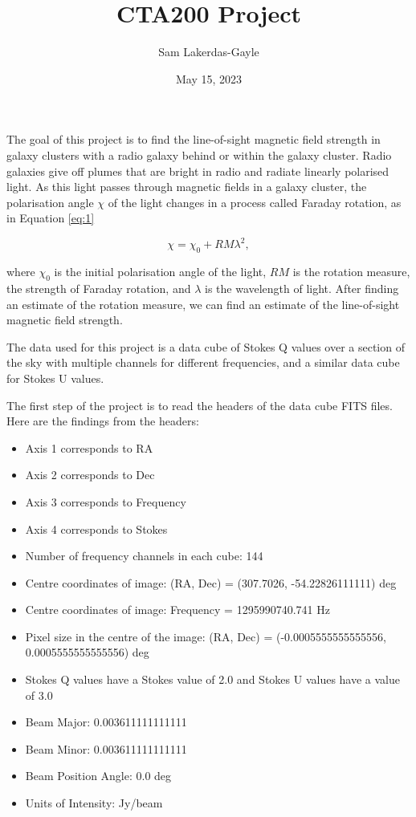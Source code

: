 \documentclass{article}
\title{CTA200 Project}
\author{Sam Lakerdas-Gayle}
\date{May 15, 2023}
\begin{document}
\maketitle

\newcommand{\pd}[2][]{\frac{\partial#1}{\partial#2}}

The goal of this project is to find the line-of-sight magnetic field strength in galaxy clusters with a radio galaxy behind or within the galaxy cluster. Radio galaxies give off plumes that are bright in radio and radiate linearly polarised light. As this light passes through magnetic fields in a galaxy cluster, the polarisation angle $\chi$ of the light changes in a process called Faraday rotation, as in Equation \ref{eq:1}

\begin{equation} \label{eq:1}
    \chi=\chi_0+RM\lambda^2,
\end{equation}

where $\chi_0$ is the initial polarisation angle of the light, $RM$ is the rotation measure, the strength of Faraday rotation, and $\lambda$ is the wavelength of light. After finding an estimate of the rotation measure, we can find an estimate of the line-of-sight magnetic field strength.

\vspace{0.3 cm}

The data used for this project is a data cube of Stokes Q values over a section of the sky with multiple channels for different frequencies, and a similar data cube for Stokes U values.

\vspace{0.3 cm}

The first step of the project is to read the headers of the data cube FITS files. Here are the findings from the headers:

\begin{itemize}
    \item Axis 1 corresponds to RA
    \item Axis 2 corresponds to Dec
    \item Axis 3 corresponds to Frequency
    \item Axis 4 corresponds to Stokes
    \item Number of frequency channels in each cube: 144
    \item Centre coordinates of image: (RA, Dec) = (307.7026, -54.22826111111) deg
    \item Centre coordinates of image: Frequency = 1295990740.741 Hz
    \item Pixel size in the centre of the image: (RA, Dec) = (-0.0005555555555556, 0.0005555555555556) deg
    \item Stokes Q values have a Stokes value of 2.0 and Stokes U values have a value of 3.0
    \item Beam Major: 0.003611111111111
    \item Beam Minor: 0.003611111111111
    \item Beam Position Angle: 0.0 deg
    \item Units of Intensity: Jy/beam
\end{itemize}
\end{document}
